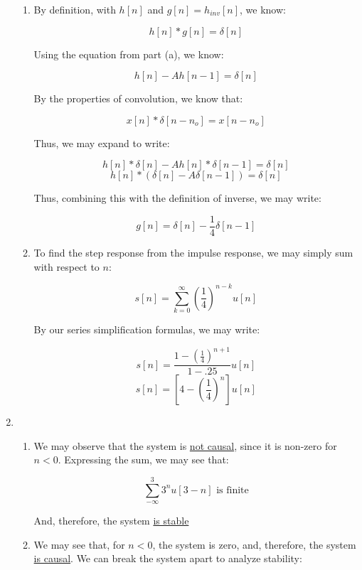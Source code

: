 \begin{enumerate}
\begin{enumerate}
      \item 

        By definition, with $h[n]$ and $g[n]=h_{inv}[n]$, we know:

        $$h[n]*g[n]=\delta[n]$$

        Using the equation from part (a), we know:

        $$h[n]-Ah[n-1]=\delta[n]$$

        By the properties of convolution, we know that:

        $$x[n]*\delta[n-n_o]=x[n-n_o]$$

        Thus, we may expand to write:

        $$h[n]*\delta[n]-Ah[n]*\delta[n-1]=\delta[n]$$
        $$h[n]*(\delta[n]-A\delta[n-1])=\delta[n]$$

        Thus, combining this with the definition of inverse, we may write:

        $$\boxed{g[n]=\delta[n]-\frac{1}{4}\delta[n-1]}$$

      \item To find the step response from the impulse response, we may simply sum with respect to $n$:

        $$s[n]=\sum_{k=0}^{\infty} \left( \frac{1}{4} \right)^{n-k}u[n]$$

        By our series simplification formulas, we may write:

        $$s[n]=\frac{1-\left( \frac{1}{4} \right)^{n+1}}{1-.25}u[n]$$
        $$\boxed{s[n]=\left[4-\left( \frac{1}{4} \right)^{n}\right]u[n]}$$

    \end{enumerate}

  \item

    \begin{enumerate}

      \item We may observe that the system is \underline{not causal}, since it is non-zero for $n<0$. Expressing the sum, we may see that:

        $$\sum_{-\infty}^3 3^nu[3-n]\text{ is finite}$$

        And, therefore, the system \underline{is stable}

      \item We may see that, for $n<0$, the system is zero, and, therefore, the system \underline{is causal}. We can break the system apart to analyze stability:


\end{enumerate}
\end{enumerate}
